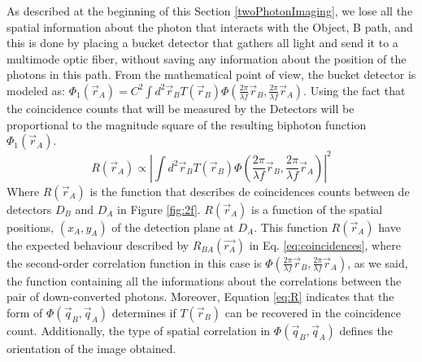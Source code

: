 As described at the beginning of this Section \ref{twoPhotonImaging}, we lose all the spatial information 
about the photon that interacts with the Object, B path, and this is done by placing a bucket detector that
gathers all light and send it to a multimode optic fiber, without saving any information about the position
of the photons in this path. From the mathematical point of view, the bucket detector is modeled
as: $\Phi_1 (\vec{r}_A) = C^2 \int d^2 \vec{r}_B T(\vec{r}_B) \Phi (\frac{2 \pi}{\lambda f}\vec{r}_B, \frac{2 \pi}{\lambda f}\vec{r}_A)$.
Using the fact that the coincidence counts that will be measured by the Detectors will be 
proportional to the magnitude square of the resulting biphoton function $\Phi_1 (\vec{r}_A)$\cite{introquantumoptics}.
\begin{equation}\label{eq:R}
R(\vec{r}_A) \propto |  \int d^2 \vec{r}_B T(\vec{r}_B) \Phi (\frac{2 \pi}{\lambda f}\vec{r}_B, \frac{2 \pi}{\lambda f}\vec{r}_A) |^2
\end{equation}
Where $R(\vec{r}_A)$ is the function that describes de coincidences counts between de detectors $D_B$ and 
$D_A$ in Figure \ref{fig:2f}. $R(\vec{r}_A)$ is a function of the spatial positions, $(x_A,y_A)$
 of the detection plane at $D_A$. This function $R(\vec{r}_A)$ have the expected behaviour described
by $R_{BA}(\vec{r_A})$ in Eq. \ref{eq:coincidences}, where the second-order correlation function in this 
case is $\Phi (\frac{2 \pi}{\lambda f}\vec{r}_B, \frac{2 \pi}{\lambda f}\vec{r}_A)$, as we said, the function
containing all the informations about the correlations between the pair of down-converted photons. 
Moreover, Equation \ref{eq:R} indicates that the form of $\Phi(\vec{q}_B,\vec{q}_A)$ determines if $T(\vec{r}_B)$ can
be recovered in the coincidence count. Additionally, the type of spatial correlation in $\Phi(\vec{q}_B,\vec{q}_A)$
defines the orientation of the image obtained.


